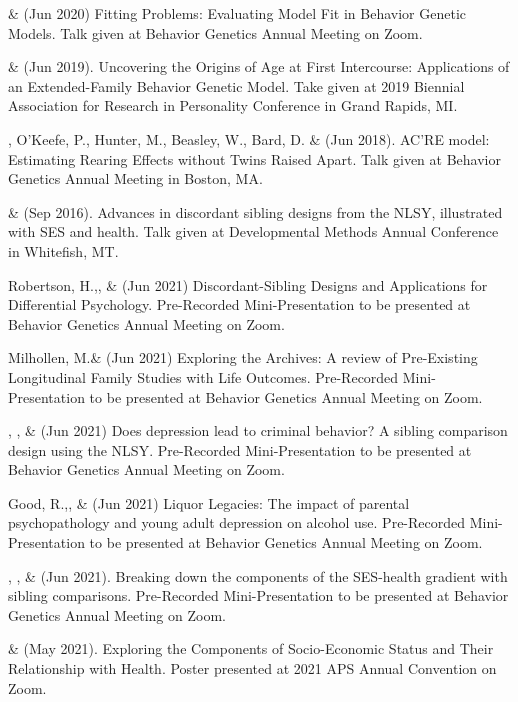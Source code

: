 \item \meb \& \Joe (Jun 2020) Fitting Problems: Evaluating Model Fit in Behavior Genetic Models. Talk given at Behavior Genetics Annual Meeting on Zoom.
%
\item \meb \& \Joe (Jun 2019). Uncovering the Origins of Age at First Intercourse: Applications of an Extended-Family Behavior Genetic Model. Take given at 2019 Biennial Association for Research in Personality Conference in Grand Rapids, MI.
%
\item\meb, O'Keefe, P., Hunter, M., Beasley, W., Bard, D. \& \Joe (Jun 2018). AC'RE model: Estimating Rearing Effects without Twins Raised Apart. Talk given at Behavior Genetics Annual Meeting in Boston, MA.
%
\item\meb \& \joe (Sep 2016). Advances in discordant sibling designs from the NLSY, illustrated with SES and health. Talk given at Developmental Methods Annual Conference in Whitefish, MT.\smallskip\\
%
%
%
\item Robertson, H.,\noteA \Joe, \&  \meb (Jun 2021) Discordant-Sibling Designs and Applications for Differential Psychology. Pre-Recorded Mini-Presentation to be presented at Behavior Genetics Annual Meeting on Zoom.
%
\item Milhollen, M.\noteA \&  \meb (Jun 2021) Exploring the Archives: A review of Pre-Existing Longitudinal Family Studies with Life Outcomes. Pre-Recorded Mini-Presentation to be presented at Behavior Genetics Annual Meeting on Zoom.
%
\item \emsims, \jt, \&  \meb (Jun 2021) Does depression lead to criminal behavior? A sibling comparison design using the NLSY. Pre-Recorded Mini-Presentation to be presented at Behavior Genetics Annual Meeting on Zoom.
%
\item Good, R.,\noteA \yrh, \&  \meb (Jun 2021) Liquor Legacies: The impact of parental psychopathology and young adult depression on alcohol use. Pre-Recorded Mini-Presentation to be presented at Behavior Genetics Annual Meeting on Zoom.
%
\item \yrh, \jt, \& \meb (Jun 2021). Breaking down the components of the SES-health gradient with sibling comparisons. Pre-Recorded Mini-Presentation to be presented at Behavior Genetics Annual Meeting on Zoom.

\item \yrh \& \meb (May 2021). Exploring the Components of Socio-Economic Status and Their Relationship with Health. Poster presented at 2021 APS Annual Convention on Zoom.

